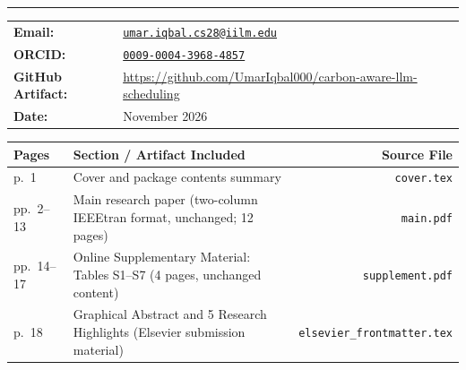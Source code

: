 \documentclass[11pt,letterpaper]{article}
\begin{document}
\thispagestyle{empty}

\vspace*{0.15in}
\par\vspace{6pt}
\noindent\rule{\textwidth}{1.2pt}
\par\vspace{14pt}

\par\vspace{14pt}

\par
{}\par
\vspace{4pt}
\noindent\begin{tabular}{@{}ll@{}}
\textbf{Email:} & \href{mailto:umar.iqbal.cs28@iilm.edu}{\texttt{umar.iqbal.cs28@iilm.edu}} \\
\textbf{ORCID:} & \href{https://orcid.org/0009-0004-3968-4857}{\texttt{0009-0004-3968-4857}} \\
\textbf{GitHub Artifact:} & \url{https://github.com/UmarIqbal000/carbon-aware-llm-scheduling} \\
\textbf{Date:} & November 2026 \\
\end{tabular}

\par\vspace{18pt}
\par\vspace{6pt}

\noindent
\begin{tabular}{@{}p{1.6cm}p{10.8cm}r@{}}
\toprule
\textbf{Pages} & \textbf{Section / Artifact Included} & \textbf{Source File} \\
\midrule
p.\ 1 & Cover and package contents summary & \texttt{cover.tex} \\
pp.\ 2--13 & Main research paper (two-column IEEEtran format, unchanged; 12 pages) & \texttt{main.pdf} \\
pp.\ 14--17 & Online Supplementary Material: Tables S1--S7 (4 pages, unchanged content) & \texttt{supplement.pdf} \\
p.\ 18 & Graphical Abstract and 5 Research Highlights (Elsevier submission material) & \texttt{elsevier\_frontmatter.tex} \\
\bottomrule
\end{tabular}
\end{document}
